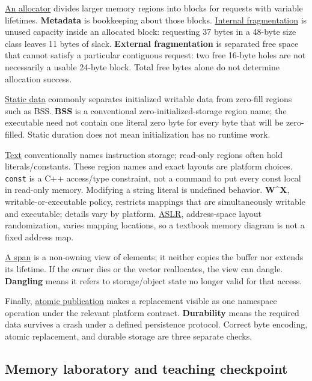 \hyperref[appendix-c3480f7d9ff3]{An allocator} divides larger memory regions into blocks for requests with variable lifetimes. \textbf{Metadata} is bookkeeping about those blocks. \hyperref[appendix-a7c50686d81f]{Internal fragmentation} is unused capacity inside an allocated block: requesting 37 bytes in a 48-byte size class leaves 11 bytes of slack. \textbf{External fragmentation} is separated free space that cannot satisfy a particular contiguous request: two free 16-byte holes are not necessarily a usable 24-byte block. Total free bytes alone do not determine allocation success.

\hyperref[appendix-17c93c4c2f19]{Static data} commonly separates initialized writable data from zero-fill regions such as BSS. \textbf{BSS} is a conventional zero-initialized-storage region name; the executable need not contain one literal zero byte for every byte that will be zero-filled. Static duration does not mean initialization has no runtime work.

\hyperref[appendix-5f9e5e2f0a5e]{Text} conventionally names instruction storage; read-only regions often hold literals/constants. These region names and exact layouts are platform choices. \texttt{const} is a C++ access/type constraint, not a command to put every const local in read-only memory. Modifying a string literal is undefined behavior. \textbf{W\^{}X}, writable-or-executable policy, restricts mappings that are simultaneously writable and executable; details vary by platform. \hyperref[appendix-78cb248c8355]{ASLR}, address-space layout randomization, varies mapping locations, so a textbook memory diagram is not a fixed address map.

\hyperref[appendix-d52e4486f527]{A span} is a non-owning view of elements; it neither copies the buffer nor extends its lifetime. If the owner dies or the vector reallocates, the view can dangle. \textbf{Dangling} means it refers to storage/object state no longer valid for that access.

Finally, \hyperref[appendix-e89a8f290ef5]{atomic publication} makes a replacement visible as one namespace operation under the relevant platform contract. \textbf{Durability} means the required data survives a crash under a defined persistence protocol. Correct byte encoding, atomic replacement, and durable storage are three separate checks.

\subsection{Memory laboratory and teaching checkpoint}\label{05-engine-i-ch002-memory-laboratory-and-teaching-checkpoint}

